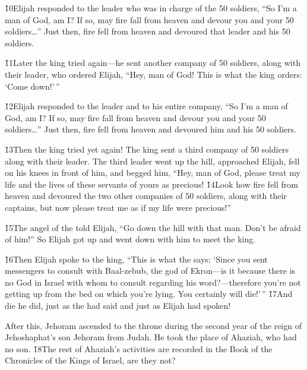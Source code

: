 \v{10}Elijah responded to the leader who was in charge of the 50 soldiers, ``So I'm a man of God, am I? If so, may fire fall from heaven and devour you and your 50 soldiers{\ldots}'' Just then, fire fell from heaven and devoured that leader and his 50 soldiers.

\v{11}Later the king tried again---he sent another company of 50 soldiers, along with their leader, who ordered Elijah, ``Hey, man of God! This is what the king orders: `Come down!'\,''

\v{12}Elijah responded to the leader and to his entire company, ``So I'm a man of God, am I? If so, may fire fall from heaven and devour you and your 50 soldiers{\ldots}'' Just then, fire fell from heaven and devoured him and his 50 soldiers.

\v{13}Then the king tried yet again! The king sent a third company of 50 soldiers along with their leader. The third leader went up the hill, approached Elijah, fell on his knees in front of him, and begged him, ``Hey, man of God, please treat my life and the lives of these servants of yours as precious! \v{14}Look how fire fell from heaven and devoured the two other companies of 50 soldiers, along with their captains, but now please treat me as if my life were precious!''

\v{15}The angel of the  told Elijah, ``Go down the hill with that man. Don't be afraid of him!'' So Elijah got up and went down with him to meet the king.

\v{16}Then Elijah spoke to the king, ``This is what the  says: `Since you sent messengers to consult with Baal-zebub, the god of Ekron---is it because there is no God in Israel with whom to consult regarding his word?---therefore you're not getting up from the bed on which you're lying. You certainly will die!'\,'' \v{17}And die he did, just as the  had said and just as Elijah had spoken!

After this, Jehoram ascended to the throne during the second year of the reign of Jehoshaphat's son Jehoram from Judah. He took the place of Ahaziah, who had no son. \v{18}The rest of Ahaziah's activities are recorded in the Book of the Chronicles of the Kings of Israel, are they not?

